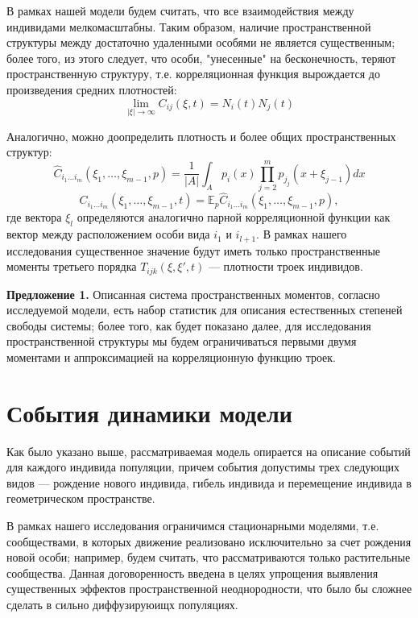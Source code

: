 В рамках нашей модели будем считать, что все взаимодействия между индивидами мелкомасштабны. Таким образом, наличие пространственной структуры между достаточно удаленными особями не является существенным; более того, из этого следует, что особи, "унесенные" на бесконечность, теряют пространственную структуру, т.е. корреляционная функция вырождается до произведения средних плотностей:
\begin{equation*}
\lim_{|\xi|\to\infty}C_{ij}(\xi,t)=N_{i}(t)N_{j}(t)
\end{equation*}

Аналогично, можно доопределить плотность и более общих пространственных структур: 
\begin{equation*}
\hat{C}_{i_{1}\ldots i_{m}}(\xi_{1},\ldots,\xi_{m-1},p)=\frac{1}{|A|}\int_{A}p_{i}(x)\prod_{j=2}^{m}p_{j_{j}}(x+\xi_{j-1})dx
\end{equation*}
\begin{equation*}
C_{i_{1}\ldots i_{m}}(\xi_{1},\ldots,\xi_{m-1},t)=\mathbb{E}_{p}\hat{C}_{i_{1}\ldots i_{m}}(\xi_{1},\ldots,\xi_{m-1},p),
\end{equation*}
где вектора $\xi_{l}$ определяются аналогично парной корреляционной функции как вектор между расположением особи вида $i_1$ и $i_{l+1}$. В рамках нашего исследования существенное значение будут иметь только пространственные моменты третьего порядка $ T_{ijk}(\xi,\xi',t) $ --- плотности троек индивидов.

\textbf{Предложение 1.} Описанная система пространственных моментов, согласно исследуемой модели, есть набор статистик для описания естественных степеней свободы системы; более того, как будет показано далее, для исследования пространственной структуры мы будем ограничиваться первыми двумя моментами и аппроксимацией на корреляционную функцию троек.

\section{События динамики модели}

Как было указано выше, рассматриваемая модель опирается на описание событий для каждого индивида популяции, причем события допустимы трех следующих видов --- рождение нового индивида, гибель индивида и перемещение индивида в геометрическом пространстве.

В рамках нашего исследования ограничимся стационарными моделями, т.е. сообществами, в которых движение реализовано исключительно за счет рождения новой особи; например, будем считать, что рассматриваются только растительные сообщества. Данная договоренность введена в целях упрощения выявления существенных эффектов пространственной неоднородности, что было бы сложнее сделать в сильно диффузируюищх популяциях.

